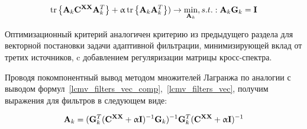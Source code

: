 \begin{equation}
    \operatorname{tr}\left\{\mathbf{A}_k \mathbf{C}^{\mathbf{X X}} \mathbf{A}_k^T\right\} +
     \upalpha \operatorname{tr}\left\{\mathbf{A}_k \mathbf{A}_k^T\right\})
    \rightarrow \underset{\mathbf{A}_k}{\min}
    , s.t.: \mathbf{A}_k \mathbf{G}_k = \mathbf{I}
\end{equation}

Оптимизационный критерий аналогичен критерию из предыдущего раздела
для векторной постановки задачи адаптивной фильтрации,
минимизирующей вклад от третих источников, c добавлением регуляризации матрицы кросс-спектра.

Проводя покомпонентный вывод методом множителей Лагранжа по аналогии с
выводом формул~\ref{lcmv_filters_vec_comp},~\ref{lcmv_filters_vec}, получим
выражения для фильтров в следующем виде:

\begin{equation}
    \mathbf{A}_k =
    (\mathbf{G}_k^T(\mathbf{C}^{\mathbf{X X}} + \upalpha \mathbf{I})^{-1} \mathbf{G}_k)^{-1} \mathbf{G}_k^T (\mathbf{C}^{\mathbf{X X}} + \upalpha \mathbf{I})^{-1}
\end{equation}
